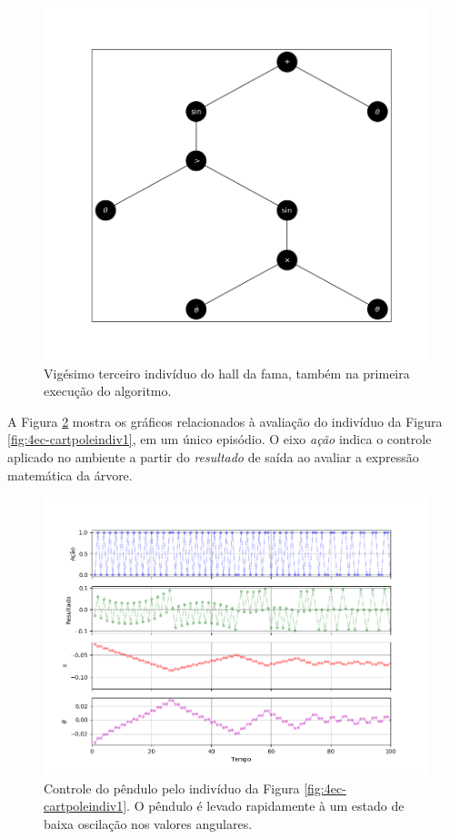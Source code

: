 \begin{figure}[H]
	\centering
	\includegraphics[width=\textwidth]{02_desenvolvimento/04_EC_Fig_CartpoleIndiv2.png}
	\caption{Vigésimo terceiro indivíduo do hall da fama, também na primeira execução do algoritmo.}
	\label{fig:4ec-cartpoleindiv2}
\end{figure}

A Figura \ref{fig:4ec-cartpolegrafaval} mostra os gráficos relacionados à avaliação do indivíduo da Figura \ref{fig:4ec-cartpoleindiv1}, em um único episódio. O eixo \textit{ação} indica o controle aplicado no ambiente a partir do \textit{resultado} de saída ao avaliar a expressão matemática da árvore.

\begin{figure}[H]
	\centering
	\includegraphics[width=\textwidth]{02_desenvolvimento/04_EC_Fig_CartpoleGraficosAval.png}
	\caption{Controle do pêndulo pelo indivíduo da Figura \ref{fig:4ec-cartpoleindiv1}. O pêndulo é levado rapidamente à um estado de baixa oscilação nos valores angulares.}
	\label{fig:4ec-cartpolegrafaval}
\end{figure}

